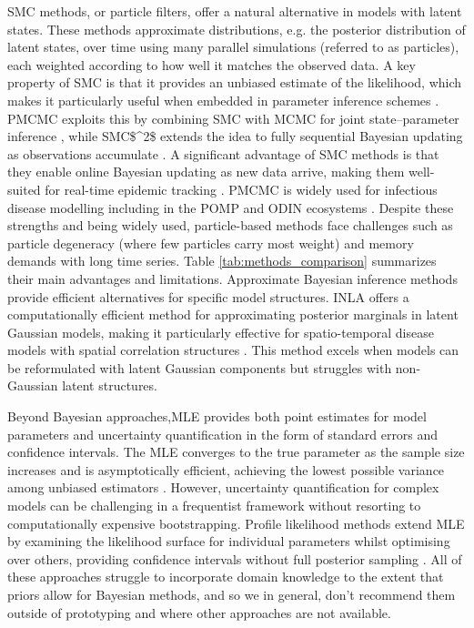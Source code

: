 \documentclass{article}
\begin{document}
\ac{SMC} methods, or particle filters, offer a natural alternative in models with latent states. These methods approximate distributions, e.g. the posterior distribution of latent states, over time using many parallel simulations (referred to as particles), each weighted according to how well it matches the observed data. A key property of \ac{SMC} is that it provides an unbiased estimate of the likelihood, which makes it particularly useful when embedded in parameter inference schemes \citep{doucet2001introduction}. \ac{PMCMC} exploits this by combining \ac{SMC} with \ac{MCMC} for joint state–parameter inference \citep{andrieu2010particle, endo2019introduction}, while \ac{SMC$^2$} extends the idea to fully sequential Bayesian updating as observations accumulate \citep{chopin2013smc2, TEMFACK2025100847}. A significant advantage of  \ac{SMC} methods is that they enable online Bayesian updating as new data arrive, making them well-suited for real-time epidemic tracking \citep{birrell2020efficient, storvik2023sequential}. 
\ac{PMCMC} is widely used for infectious disease modelling including in the \ac{POMP} and ODIN ecosystems \citep{king2016statistical, fitzjohn2021reproducible}. Despite these strengths and being widely used, particle-based methods face challenges such as particle degeneracy (where few particles carry most weight) and memory demands with long time series. Table \ref{tab:methods_comparison} summarizes their main advantages and limitations.
Approximate Bayesian inference methods provide efficient alternatives for specific model structures.
\ac{INLA} offers a computationally efficient method for approximating posterior marginals in latent Gaussian models, making it particularly effective for spatio-temporal disease models with spatial correlation structures \citep{rue2017bayesian}.
This method excels when models can be reformulated with latent Gaussian components but struggles with non-Gaussian latent structures.

Beyond Bayesian approaches,\ac{MLE} provides both point estimates for model parameters and uncertainty quantification in the form of standard errors and confidence intervals. The \ac{MLE} converges to the true parameter as the sample size increases and is asymptotically efficient, achieving the lowest possible variance among unbiased estimators \citep{myung2003tutorial, baltazar2024maximum}. However, uncertainty quantification for complex models can be challenging in a frequentist framework without resorting to computationally expensive bootstrapping.
Profile likelihood methods extend \ac{MLE} by examining the likelihood surface for individual parameters whilst optimising over others, providing confidence intervals without full posterior sampling \citep{tonsing2018profile, plank2024structured}.
All of these approaches struggle to incorporate domain knowledge to the extent that priors allow for Bayesian methods, and so we in general, don't recommend them outside of prototyping and where other approaches are not available.
\end{document}
